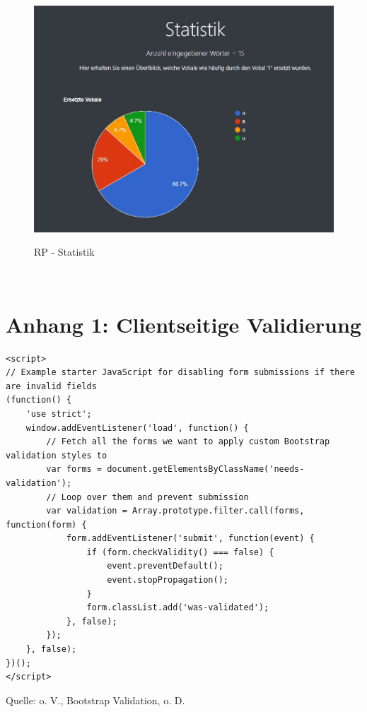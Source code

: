 \documentclass[a4paper,
12pt,
oneside]
{article}
\begin{document}
\begin{figure}[h]
	\centering
	\caption{RP - Statistik}
	\includegraphics[width=1\textwidth]{img/statistik.jpg} \\
	\label{fig:statistic}
\end{figure} \\
	\clearpage
	
	
	
	
	
	\section*{Anhang 1: Clientseitige Validierung}
	\begin{lstlisting}
<script>
// Example starter JavaScript for disabling form submissions if there are invalid fields
(function() {
	'use strict';
	window.addEventListener('load', function() {
		// Fetch all the forms we want to apply custom Bootstrap validation styles to
		var forms = document.getElementsByClassName('needs-validation');
		// Loop over them and prevent submission
		var validation = Array.prototype.filter.call(forms, function(form) {
			form.addEventListener('submit', function(event) {
				if (form.checkValidity() === false) {
					event.preventDefault();
					event.stopPropagation();
				}
				form.classList.add('was-validated');
			}, false);
		});
	}, false);
})();
</script>
	\end{lstlisting}
	{\centering\footnotesize Quelle: o. V., Bootstrap Validation, o. D.\par}
	\clearpage
	
\end{document}
